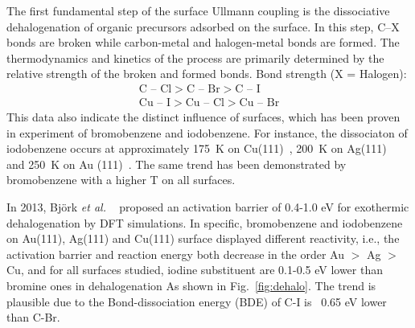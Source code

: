 \documentclass[%
 reprint,
 amsmath,amssymb,
 aps,
prb,
]{revtex4-1}
\begin{document}
The first fundamental step of the surface Ullmann coupling is the dissociative dehalogenation of organic precursors adsorbed on the surface. In this step, C--X bonds are broken while carbon-metal and halogen-metal bonds are formed. The thermodynamics and kinetics of the process are primarily determined by the relative strength of the broken and formed bonds. 
Bond strength (X = Halogen): 
%
\begin{eqnarray}
\text{C -- Cl} > \text{C -- Br} > \text{C -- I} \\ 
\text{Cu -- I} > \text{Cu -- Cl} > \text{Cu -- Br}
\end{eqnarray}
%
This data also indicate the distinct influence of surfaces, which has been proven in experiment of bromobenzene and iodobenzene. For instance, the dissociaton of iodobenzene occurs at approximately 175~K on Cu(111)~\cite{sur_sci01}, 200~K on Ag(111)~\cite{sur_sci02} and 250~K on Au (111)~\cite{sur_sci03}. The same trend has been demonstrated by bromobenzene with a higher T on all surfaces.

In 2013, Björk \textit{et al.} ~\cite{jacs2013} proposed an activation barrier of 0.4-1.0 eV for exothermic dehalogenation by DFT simulations. In specific, bromobenzene and iodobenzene on Au(111), Ag(111) and Cu(111) surface displayed different reactivity, i.e., the activation barrier and reaction energy both decrease in the order Au $>$ Ag $>$ Cu, and for all surfaces studied, iodine substituent are 0.1-0.5 eV lower than bromine ones in dehalogenation As shown in Fig.~\ref{fig:dehalo}. The trend is plausible due to the Bond-dissociation energy (BDE) of C-I is ~0.65 eV lower than C-Br\cite{Arpc1982}.
\end{document}
